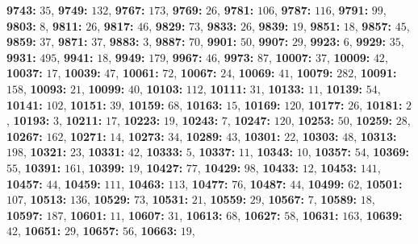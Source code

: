 \textsf{\bfseries 9743:} $35$, \textsf{\bfseries 9749:} $132$, \textsf{\bfseries 9767:} $173$, \textsf{\bfseries 9769:} $26$, \textsf{\bfseries 9781:} $106$, \textsf{\bfseries 9787:} $116$, \textsf{\bfseries 9791:} $99$, \textsf{\bfseries 9803:} $8$, \textsf{\bfseries 9811:} $26$, \textsf{\bfseries 9817:} $46$, \textsf{\bfseries 9829:} $73$, \textsf{\bfseries 9833:} $26$, \textsf{\bfseries 9839:} $19$, \textsf{\bfseries 9851:} $18$, \textsf{\bfseries 9857:} $45$, \textsf{\bfseries 9859:} $37$, \textsf{\bfseries 9871:} $37$, \textsf{\bfseries 9883:} $3$, \textsf{\bfseries 9887:} $70$, \textsf{\bfseries 9901:} $50$, \textsf{\bfseries 9907:} $29$, \textsf{\bfseries 9923:} $6$, \textsf{\bfseries 9929:} $35$, \textsf{\bfseries 9931:} $495$, \textsf{\bfseries 9941:} $18$, \textsf{\bfseries 9949:} $179$, \textsf{\bfseries 9967:} $46$, \textsf{\bfseries 9973:} $87$, \textsf{\bfseries 10007:} $37$, \textsf{\bfseries 10009:} $42$, \textsf{\bfseries 10037:} $17$, \textsf{\bfseries 10039:} $47$, \textsf{\bfseries 10061:} $72$, \textsf{\bfseries 10067:} $24$, \textsf{\bfseries 10069:} $41$, \textsf{\bfseries 10079:} $282$, \textsf{\bfseries 10091:} $158$, \textsf{\bfseries 10093:} $21$, \textsf{\bfseries 10099:} $40$, \textsf{\bfseries 10103:} $112$, \textsf{\bfseries 10111:} $31$, \textsf{\bfseries 10133:} $11$, \textsf{\bfseries 10139:} $54$, \textsf{\bfseries 10141:} $102$, \textsf{\bfseries 10151:} $39$, \textsf{\bfseries 10159:} $68$, \textsf{\bfseries 10163:} $15$, \textsf{\bfseries 10169:} $120$, \textsf{\bfseries 10177:} $26$, \textsf{\bfseries 10181:} $2$, \textsf{\bfseries 10193:} $3$, \textsf{\bfseries 10211:} $17$, \textsf{\bfseries 10223:} $19$, \textsf{\bfseries 10243:} $7$, \textsf{\bfseries 10247:} $120$, \textsf{\bfseries 10253:} $50$, \textsf{\bfseries 10259:} $28$, \textsf{\bfseries 10267:} $162$, \textsf{\bfseries 10271:} $14$, \textsf{\bfseries 10273:} $34$, \textsf{\bfseries 10289:} $43$, \textsf{\bfseries 10301:} $22$, \textsf{\bfseries 10303:} $48$, \textsf{\bfseries 10313:} $198$, \textsf{\bfseries 10321:} $23$, \textsf{\bfseries 10331:} $42$, \textsf{\bfseries 10333:} $5$, \textsf{\bfseries 10337:} $11$, \textsf{\bfseries 10343:} $10$, \textsf{\bfseries 10357:} $54$, \textsf{\bfseries 10369:} $55$, \textsf{\bfseries 10391:} $161$, \textsf{\bfseries 10399:} $19$, \textsf{\bfseries 10427:} $77$, \textsf{\bfseries 10429:} $98$, \textsf{\bfseries 10433:} $12$, \textsf{\bfseries 10453:} $141$, \textsf{\bfseries 10457:} $44$, \textsf{\bfseries 10459:} $111$, \textsf{\bfseries 10463:} $113$, \textsf{\bfseries 10477:} $76$, \textsf{\bfseries 10487:} $44$, \textsf{\bfseries 10499:} $62$, \textsf{\bfseries 10501:} $107$, \textsf{\bfseries 10513:} $136$, \textsf{\bfseries 10529:} $73$, \textsf{\bfseries 10531:} $21$, \textsf{\bfseries 10559:} $29$, \textsf{\bfseries 10567:} $7$, \textsf{\bfseries 10589:} $18$, \textsf{\bfseries 10597:} $187$, \textsf{\bfseries 10601:} $11$, \textsf{\bfseries 10607:} $31$, \textsf{\bfseries 10613:} $68$, \textsf{\bfseries 10627:} $58$, \textsf{\bfseries 10631:} $163$, \textsf{\bfseries 10639:} $42$, \textsf{\bfseries 10651:} $29$, \textsf{\bfseries 10657:} $56$, \textsf{\bfseries 10663:} $19$, 
